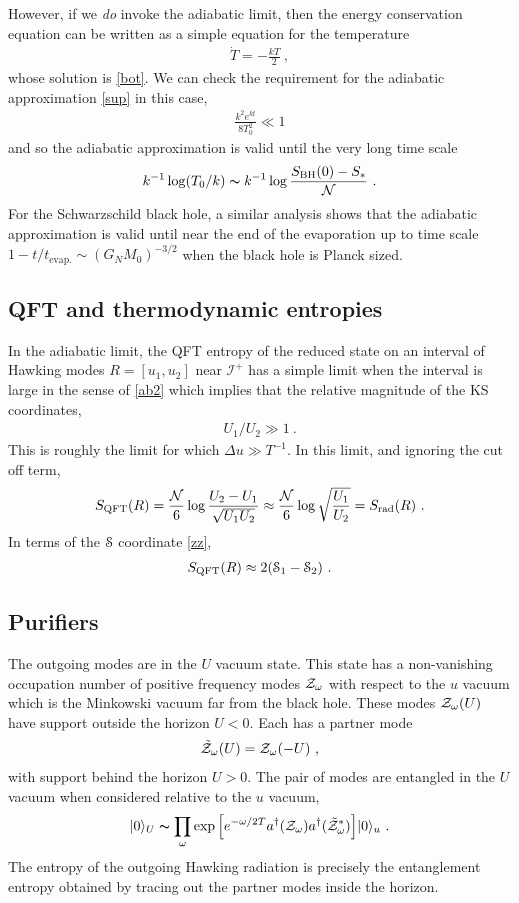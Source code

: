 \documentclass[12pt]{article}
\newcommand\SBH{S_\text{BH}}
\newcommand\ZZ{\EuScript S}
\newcommand{\ket}[1]{|#1\rangle}
\newcommand{\EQ}[1]{\begin{equation}\begin{split} #1
\end{split}\end{equation}}
\begin{document}
However, if we \emph{do} invoke the adiabatic limit, then the energy conservation equation can be written as a simple equation for the temperature
\EQ{
\dot T=-\frac{kT}2\ ,
}
whose solution is \eqref{bot}. We can check the requirement for the adiabatic approximation \eqref{sup} in this case,
\EQ{
\frac{k^2e^{kt}}{8T_0^2}\ll 1
}
and so the adiabatic approximation is valid until the very long time scale
\EQ{
k^{-1}\log(T_0/k)\thicksim k^{-1}\log\frac{\SBH (0)-S_*}{\cal N}\ .
}
For the Schwarzschild black hole, a similar analysis shows that the adiabatic approximation is valid until near the end of the evaporation up to time scale $1-t/t_\text{evap.}\sim(G_NM_0)^{-3/2}$ when the black hole is Planck sized. 

\subsection{QFT and thermodynamic entropies}

In the adiabatic limit, the QFT entropy of the reduced state on an interval of Hawking modes $R=[u_1,u_2]$ near $\mathscr I^+$ has a simple limit when the interval is large in the sense of \eqref{ab2} which implies that the relative magnitude of the KS coordinates, 
\EQ{
U_1/U_2\gg1\ .
\label{fot}
}
This is roughly the limit for which $\Delta u\gg T^{-1}$. In this limit, and ignoring the cut off term,
\EQ{
S_\text{QFT}(R)=\frac{\cal N}6\log\frac{U_2-U_1}{\sqrt{U_1U_2}}\approx\frac{\cal N}6\log\sqrt{\frac{U_1}{U_2}}=S_\text{rad}(R)\ .
\label{gcx}
}
In terms of the $\ZZ$ coordinate \eqref{zz}, 
\EQ{
S_\text{QFT}(R)\approx2(\ZZ_1-\ZZ_2)\ .
}


\subsection{Purifiers}

The outgoing modes are in the $U$ vacuum state. This state has a non-vanishing occupation number of positive frequency modes ${\cal Z}_\omega$ with respect to the $u$ vacuum which is the Minkowski vacuum far from the black hole. These modes ${\cal Z}_\omega(U)$ have support outside the horizon $U<0$. Each has a partner mode 
\EQ{
\tilde {\cal Z}_\omega(U)={\cal Z}_\omega(-U)\ ,
}
with support behind the horizon $U>0$. The pair of modes are entangled in the $U$ vacuum when considered relative to the $u$ vacuum,
\EQ{
\ket{0}_U\thicksim \prod_\omega\exp\Big[e^{-\omega/2T}a^\dagger({\cal Z}_\omega)a^\dagger(\tilde {\cal Z}^*_\omega)\Big]\ket{0}_u\ .
}
The entropy of the outgoing Hawking radiation is precisely the entanglement entropy obtained by tracing out the partner modes inside the horizon. 
\end{document}
